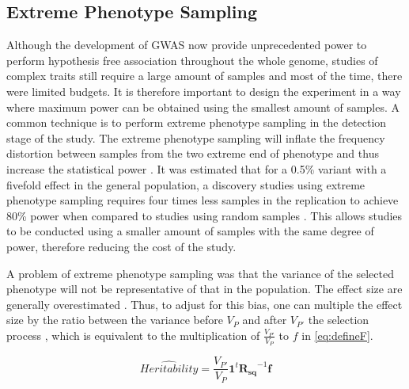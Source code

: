 		\subsection{Extreme Phenotype Sampling}
			Although the development of \gls{GWAS} now provide unprecedented power to perform hypothesis free association throughout the whole genome, studies of complex traits still require a large amount of samples and most of the time, there were limited budgets.
			It is therefore important to design the experiment in a way where maximum power can be obtained using the smallest amount of samples.
			A common technique is to perform extreme phenotype sampling in the detection stage of the study.
			The extreme phenotype sampling will inflate the frequency distortion between samples from the two extreme end of phenotype and thus increase the statistical power \citep{Guey2011}.
			It was estimated that for a 0.5\% variant with a fivefold effect in the general population, a discovery studies using extreme phenotype sampling requires four times less samples in the replication to achieve 80\% power when compared to studies using random samples \citep{Guey2011}.
			This allows studies to be conducted using a smaller amount of samples with the same degree of power, therefore reducing the cost of the study.
			
			A problem of extreme phenotype sampling was that the variance of the selected phenotype will not be representative of that in the population.
			The effect size are generally overestimated \citep{Guey2011}. 
			Thus, to adjust for this bias, one can multiple the effect size by the ratio between the variance before $V_P$ and after $V_{P'}$ the selection process \citep{Sham2014}, which is equivalent to the multiplication of $\frac{V_{P'}}{V_P}$ to $f$ in \cref{eq:defineF}.
			
			\begin{equation}
			\hat{Heritability} = \frac{V_{P'}}{V_P}\boldsymbol{1}^t\boldsymbol{R_{sq}}^{-1}\boldsymbol{f}
			\label{eq:extremeShrek}
			\end{equation}
			
